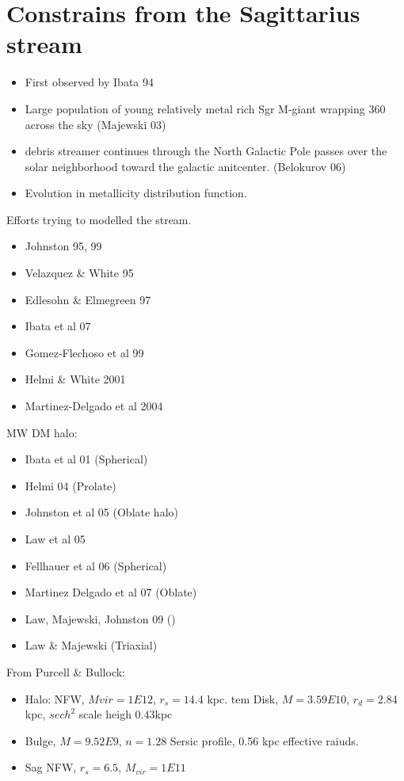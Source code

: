 \documentclass[16pt]{article}
\begin{document}
\newpage\null\thispagestyle{empty}\newpage

\section{Constrains from the Sagittarius stream}

\begin{itemize}
\item First observed by Ibata 94
\item Large population of young relatively metal rich Sgr M-giant wrapping 360
across the sky  (Majewski 03)
\item debris streamer continues through the North Galactic Pole passes over the 
solar neighborhood toward the galactic anitcenter. (Belokurov 06)
\item Evolution in metallicity distribution function.
\end{itemize}

Efforts trying to modelled the stream. 

\begin{itemize}
\item Johnston 95, 99
\item Velazquez \& White 95
\item Edlesohn \& Elmegreen 97
\item Ibata et al 07
\item Gomez-Flechoso et al 99
\item Helmi \& White 2001
\item Martinez-Delgado et al 2004
\end{itemize}

MW DM halo:

\begin{itemize}
\item Ibata et al 01 (Spherical)
\item Helmi 04 (Prolate)
\item Johnston et al 05 (Oblate halo)
\item Law et al 05
\item Fellhauer et al 06 (Spherical)
\item Martinez Delgado et al 07 (Oblate)
\item Law, Majewski, Johnston 09 ()
\item Law \& Majewski (Triaxial)

\end{itemize}

From Purcell \& Bullock:

\begin{itemize}
\item Halo: NFW, $Mvir=1E12$, $r_s=14.4$ kpc.
tem Disk, $M=3.59E10$, $r_d = 2.84$kpc, $sech^2$ scale heigh $0.43$kpc
\item Bulge, $M=9.52E9$, $n=1.28$ Sersic profile, 0.56 kpc effective raiuds.
\item Sag NFW, $r_s = 6.5$, $M_{vir}=1E11$

\end{itemize}
\end{document}
